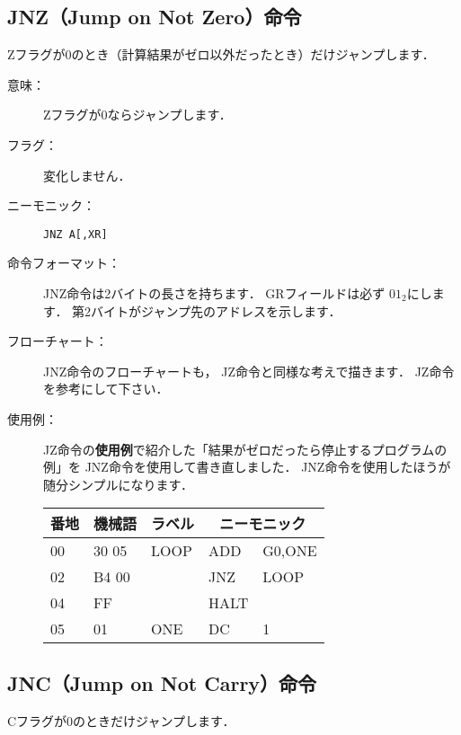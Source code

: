 \subsection{JNZ（Jump on Not Zero）命令}
Zフラグが0のとき（計算結果がゼロ以外だったとき）だけジャンプします．

\begin{description}
\item[意味：]Zフラグが0ならジャンプします．

\item[フラグ：]変化しません．

\item[ニーモニック：]{\tt JNZ  A[,XR]} 

\item[命令フォーマット：]JNZ命令は2バイトの長さを持ちます．
GRフィールドは必ず $01_2$にします．
第2バイトがジャンプ先のアドレスを示します．


\item[フローチャート：]JNZ命令のフローチャートも，
JZ命令と同様な考えで描きます．
JZ命令を参考にして下さい．

\item[使用例：]
JZ命令の{\bf 使用例}で紹介した「結果がゼロだったら停止するプログラムの例」を
JNZ命令を使用して書き直しました．
JNZ命令を使用したほうが随分シンプルになります．

{\tt\small\begin{center}
\begin{tabular}{|l|l|l|l l|} \hline
番地 & 機械語 & ラベル & \multicolumn{2}{|c|}{ニーモニック} \\
\hline
00 & 30 05 & LOOP & ADD  & G0,ONE  \\
02 & B4 00 &      & JNZ  & LOOP    \\
04 & FF    &      & HALT &         \\
05 & 01    & ONE  & DC   & 1       \\
\hline
\end{tabular}
\end{center}}
\end{description}

\subsection{JNC（Jump on Not Carry）命令}
Cフラグが0のときだけジャンプします．

